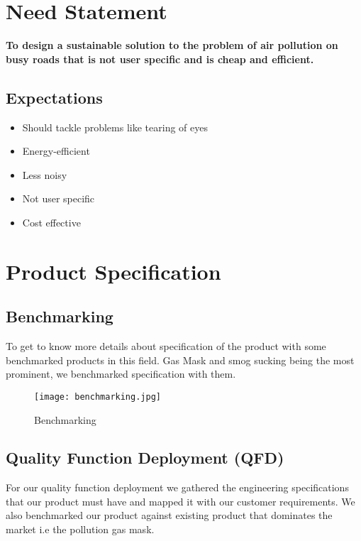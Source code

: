 \documentclass[12pt]{article}
\begin{document}
\section{Need Statement}

\textbf{To design a sustainable solution to the problem of air pollution on busy roads that is not user specific and is cheap and efficient.}

\subsection{Expectations}

\begin{itemize}
\item Should tackle problems like tearing of eyes
\item Energy-efficient
\item Less noisy
\item Not user specific
\item Cost effective
\end{itemize}

\newpage

\section{Product Specification}

\subsection{Benchmarking}
To get to know more details about specification of the product with some benchmarked products in this field. Gas Mask and smog sucking being the most prominent, we benchmarked specification with them.

\begin{figure}[!htb]
\centering
\texttt{[image: benchmarking.jpg]}
\caption{\label{fig:}Benchmarking}
\end{figure}

\newpage

\subsection{Quality Function Deployment (QFD)}
For our quality function deployment we gathered the engineering specifications that our product must have and mapped it with our customer requirements. We also benchmarked our product against existing product that dominates the market i.e the pollution gas mask.
\end{document}
